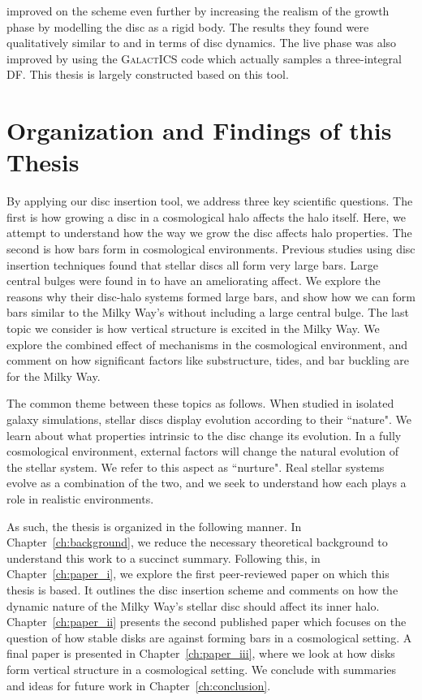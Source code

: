 \citet{bauer2018a} improved on the scheme even further by increasing the realism of the growth phase by modelling the disc as a rigid body. The results they found were qualitatively similar to \citet{debuhr_2012} and \citet{ys_2015}  in terms of disc dynamics. The live phase was also improved by using the \textsc{GalactICS} code which actually samples a three-integral DF. This thesis is largely constructed based on this tool.


\section{Organization and Findings of this Thesis}

By applying our disc insertion tool, we address three key scientific questions. The first is how growing a disc in a cosmological halo affects the halo itself. Here, we attempt to understand how the way we grow the disc affects halo properties. The second is how bars form in cosmological environments. Previous studies using disc insertion techniques found that stellar discs all form very large bars. Large central bulges were found in \citet{ys_2015} to have an ameliorating affect. We explore the reasons why their disc-halo systems formed large bars, and show how we can form bars similar to the Milky Way's without including a large central bulge. The last topic we consider is how vertical structure is excited in the Milky Way. We explore the combined effect of mechanisms in the cosmological environment, and comment on how significant factors like substructure, tides, and bar buckling are for the Milky Way.

The common theme between these topics as follows. When studied in isolated galaxy simulations, stellar discs display evolution according to their ``nature". We learn about what properties intrinsic to the disc change its evolution. In a fully cosmological environment, external factors will change the natural evolution of the stellar system. We refer to this aspect as  ``nurture". Real stellar systems evolve as a combination of the two, and we seek to understand how each plays a role in realistic environments. 

As such, the thesis is organized in the following manner. In Chapter~\ref{ch:background}, we reduce the necessary theoretical background to understand this work to a succinct summary. Following this, in Chapter~\ref{ch:paper_i}, we explore the first peer-reviewed paper on which this thesis is based. It outlines the disc insertion scheme and comments on how the dynamic nature of the Milky Way's stellar disc should affect its inner halo. Chapter~\ref{ch:paper_ii} presents the second published paper which focuses on the question of how stable disks are against forming bars in a cosmological setting. A final paper is presented in Chapter~\ref{ch:paper_iii}, where we look at how disks form vertical structure in a cosmological setting. We conclude with summaries and ideas for future work in Chapter~\ref{ch:conclusion}.


